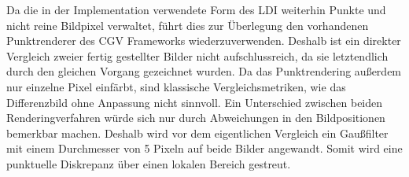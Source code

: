 \documentclass[hyperref, beleg, german, final, twoside]{cgvpub}
\begin{document}
Da die in der Implementation verwendete Form des LDI weiterhin Punkte und nicht
reine Bildpixel verwaltet, führt dies zur Überlegung den vorhandenen
Punktrenderer des CGV Frameworks wiederzuverwenden. Deshalb ist ein direkter
Vergleich zweier fertig gestellter Bilder nicht aufschlussreich, da sie
letztendlich durch den gleichen Vorgang gezeichnet wurden. Da das
Punktrendering außerdem nur einzelne Pixel einfärbt, sind klassische
Vergleichsmetriken, wie das Differenzbild ohne Anpassung nicht sinnvoll. Ein
Unterschied zwischen beiden Renderingverfahren würde sich nur durch
Abweichungen in den Bildpositionen bemerkbar machen. Deshalb wird vor dem
eigentlichen Vergleich ein Gaußfilter mit einem Durchmesser von 5 Pixeln auf
beide Bilder angewandt. Somit wird eine punktuelle Diskrepanz über einen
lokalen Bereich gestreut.
\end{document}
